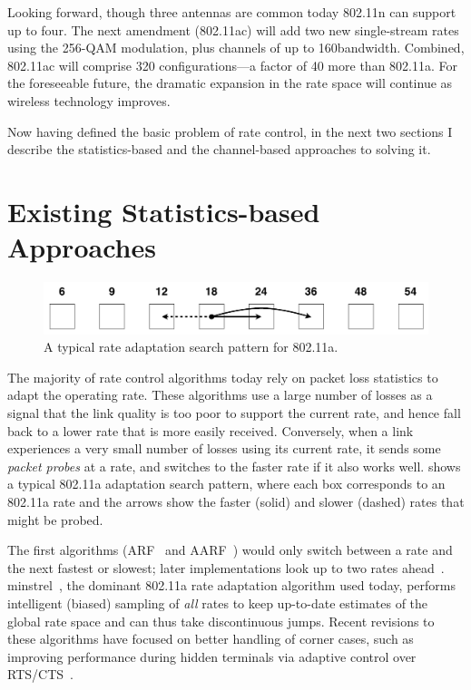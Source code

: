 Looking forward, though three antennas are common today 802.11n can support up to four. The next amendment (802.11ac) will add two new single-stream rates using the 256-QAM modulation, plus channels of up to 160\MHz bandwidth. Combined, 802.11ac will comprise 320 configurations---a factor of 40 more than 802.11a. For the foreseeable future, the dramatic expansion in the rate space will continue as wireless technology improves.

Now having defined the basic problem of rate control, in the next two sections I describe the statistics-based and the channel-based approaches to solving it.

\section{Existing Statistics-based Approaches}
\begin{figure}[t]
      \centering
      \includegraphics[scale=0.4]{figures/approach_figs/search_11a.pdf}
      \caption[Rate adaptation search pattern for 802.11a]{\label{fig:search_11a}A typical rate adaptation search pattern for 802.11a.}
\end{figure}
The majority of rate control algorithms today rely on packet loss statistics to adapt the operating rate. These algorithms use a large number of losses as a signal that the link quality is too poor to support the current rate, and hence fall back to a lower rate that is more easily received. Conversely, when a link experiences a very small number of losses using its current rate, it sends some \emph{packet probes} at a rate, and switches to the faster rate if it also works well.  shows a typical 802.11a adaptation search pattern, where each box corresponds to an 802.11a rate and the arrows show the faster (solid) and slower (dashed) rates that might be probed.

The first algorithms (ARF~\cite{Kamerman_ARF} and AARF~\cite{Lacage_AARF}) would only switch between a rate and the next fastest or slowest; later implementations look up to two rates ahead~\cite{Bicket_SampleRate}. minstrel~\cite{minstrel}, the dominant 802.11a rate adaptation algorithm used today, performs intelligent (biased) sampling of \emph{all} rates to keep up-to-date estimates of the global rate space and can thus take discontinuous jumps. Recent revisions to these algorithms have focused on better handling of corner cases, such as improving performance during hidden terminals via adaptive control over RTS/CTS~\cite{minstrel,Wong_RRAA}.

